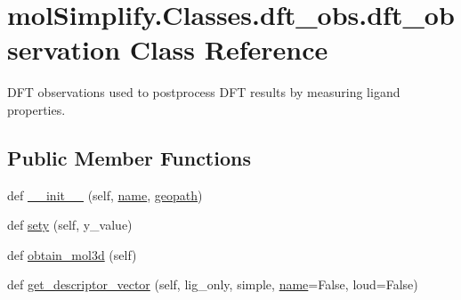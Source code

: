 \hypertarget{classmolSimplify_1_1Classes_1_1dft__obs_1_1dft__observation}{}\section{mol\+Simplify.\+Classes.\+dft\+\_\+obs.\+dft\+\_\+observation Class Reference}
\label{classmolSimplify_1_1Classes_1_1dft__obs_1_1dft__observation}


D\+FT observations used to postprocess D\+FT results by measuring ligand properties.  


\subsection*{Public Member Functions}
\begin{DoxyCompactItemize}
\item 
def \hyperlink{classmolSimplify_1_1Classes_1_1dft__obs_1_1dft__observation_a44238b2c5816f42b2971cd8627142c39}{\+\_\+\+\_\+init\+\_\+\+\_\+} (self, \hyperlink{classmolSimplify_1_1Classes_1_1dft__obs_1_1dft__observation_ac6d6bb5f8bab62c015d503390b3266b1}{name}, \hyperlink{classmolSimplify_1_1Classes_1_1dft__obs_1_1dft__observation_ab37a4e8468ae3226fe959ff5e9dedfd9}{geopath})
\item 
def \hyperlink{classmolSimplify_1_1Classes_1_1dft__obs_1_1dft__observation_ae25fef2cc1719ce818f611441bdb89ae}{sety} (self, y\+\_\+value)
\item 
def \hyperlink{classmolSimplify_1_1Classes_1_1dft__obs_1_1dft__observation_a23be02c84b32679b9b1e5fcd15093624}{obtain\+\_\+mol3d} (self)
\item 
def \hyperlink{classmolSimplify_1_1Classes_1_1dft__obs_1_1dft__observation_a1e6eeb106260cf6834680a36e09c276c}{get\+\_\+descriptor\+\_\+vector} (self, lig\+\_\+only, simple, \hyperlink{classmolSimplify_1_1Classes_1_1dft__obs_1_1dft__observation_ac6d6bb5f8bab62c015d503390b3266b1}{name}=False, loud=False)
\end{DoxyCompactItemize}
